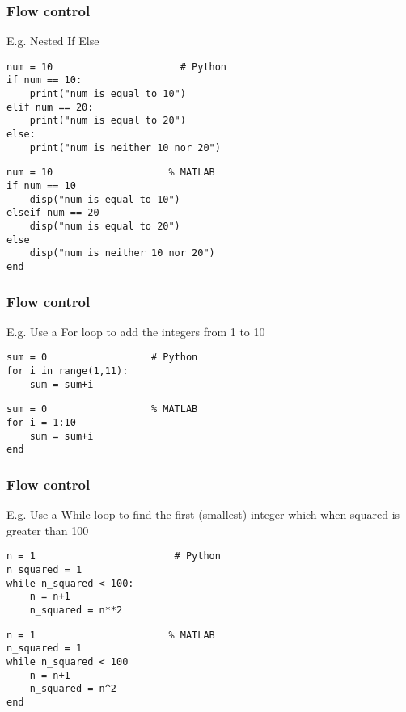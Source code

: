 \documentclass[english,14pt]{beamer}
\begin{document}

\begin{frame}[fragile]

\frametitle{Flow control}

 E.g. Nested If Else

\begin{lstlisting}[style=CStyle]
num = 10                      # Python
if num == 10:
    print("num is equal to 10")
elif num == 20:
    print("num is equal to 20")
else:
    print("num is neither 10 nor 20")
\end{lstlisting}   

\begin{lstlisting}[style=MStyle]
num = 10                    % MATLAB
if num == 10
    disp("num is equal to 10")
elseif num == 20
    disp("num is equal to 20")
else
    disp("num is neither 10 nor 20")
end
\end{lstlisting}

\end{frame}


\begin{frame}[fragile]

\frametitle{Flow control}

E.g. Use a For loop to add the integers from 1 to 10

\begin{lstlisting}[style=CStyle]
sum = 0                  # Python
for i in range(1,11):
    sum = sum+i
\end{lstlisting}
\begin{lstlisting}[style=MStyle]
sum = 0                  % MATLAB
for i = 1:10
    sum = sum+i
end
\end{lstlisting} 
\end{frame}


\begin{frame}[fragile]

\frametitle{Flow control}

E.g. Use a While loop to find the first (smallest) integer which when squared is greater than 100

\begin{lstlisting}[style=CStyle]
n = 1                        # Python
n_squared = 1
while n_squared < 100:
    n = n+1
    n_squared = n**2
\end{lstlisting}
\begin{lstlisting}[style=MStyle]
n = 1                       % MATLAB
n_squared = 1
while n_squared < 100
    n = n+1
    n_squared = n^2
end
\end{lstlisting} 
\end{frame}
\end{document}
